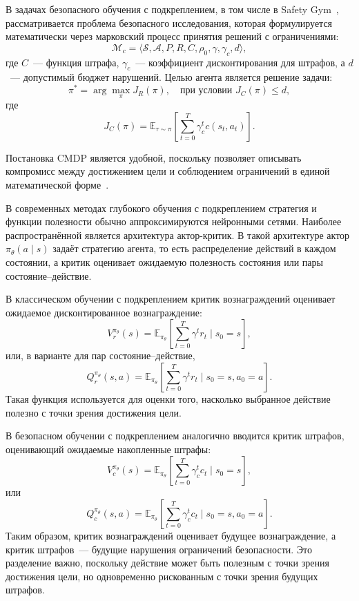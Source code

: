 В задачах безопасного обучения с подкреплением, в том числе в Safety Gym~\cite{ray2019benchmarking}, рассматривается проблема безопасного исследования, которая формулируется математически через марковский процесс принятия решений с ограничениями:
\begin{equation}
\mathcal{M}_c =
\langle \mathcal{S}, \mathcal{A}, P, R, C, \rho_0, \gamma, \gamma_c, d \rangle,
\end{equation}
где $C$~--- функция штрафа, $\gamma_c$~--- коэффициент дисконтирования для штрафов, а $d$~--- допустимый бюджет нарушений. Целью агента является решение задачи:
\begin{equation}
\pi^* =
\arg\max_{\pi} J_R(\pi),
\quad
\text{при условии }
J_C(\pi) \leq d,
\end{equation}
где
\begin{equation}
J_C(\pi) =
\mathbb{E}_{\tau \sim \pi}
\left[
\sum_{t=0}^{T} \gamma_c^t c(s_t,a_t)
\right].
\end{equation}

Постановка CMDP является удобной, поскольку позволяет описывать компромисс между достижением цели и соблюдением ограничений в единой математической форме~\cite{altman1999constrained}.

В современных методах глубокого обучения с подкреплением стратегия и функции полезности обычно аппроксимируются нейронными сетями. Наиболее распространённой является архитектура актор-критик. В такой архитектуре актор $\pi_\theta(a \mid s)$ задаёт стратегию агента, то есть распределение действий в каждом состоянии, а критик оценивает ожидаемую полезность состояния или пары состояние--действие.

В классическом обучении с подкреплением критик вознаграждений оценивает ожидаемое дисконтированное вознаграждение:
\begin{equation}
V^{\pi_\theta}_r(s) =
\mathbb{E}_{\pi_\theta}
\left[
\sum_{t=0}^{T} \gamma^t r_t
\mid s_0=s
\right],
\end{equation}
или, в варианте для пар состояние--действие,
\begin{equation}
Q^{\pi_\theta}_r(s,a) =
\mathbb{E}_{\pi_\theta}
\left[
\sum_{t=0}^{T} \gamma^t r_t
\mid s_0=s, a_0=a
\right].
\end{equation}
Такая функция используется для оценки того, насколько выбранное действие полезно с точки зрения достижения цели.

В безопасном обучении с подкреплением аналогично вводится критик штрафов, оценивающий ожидаемые накопленные штрафы:
\begin{equation}
V^{\pi_\theta}_c(s) =
\mathbb{E}_{\pi_\theta}
\left[
\sum_{t=0}^{T} \gamma_c^t c_t
\mid s_0=s
\right],
\end{equation}
или
\begin{equation}
Q^{\pi_\theta}_c(s,a) =
\mathbb{E}_{\pi_\theta}
\left[
\sum_{t=0}^{T} \gamma_c^t c_t
\mid s_0=s, a_0=a
\right].
\end{equation}
Таким образом, критик вознаграждений оценивает будущее вознаграждение, а критик штрафов~--- будущие нарушения ограничений безопасности. Это разделение важно, поскольку действие может быть полезным с точки зрения достижения цели, но одновременно рискованным с точки зрения будущих штрафов.

